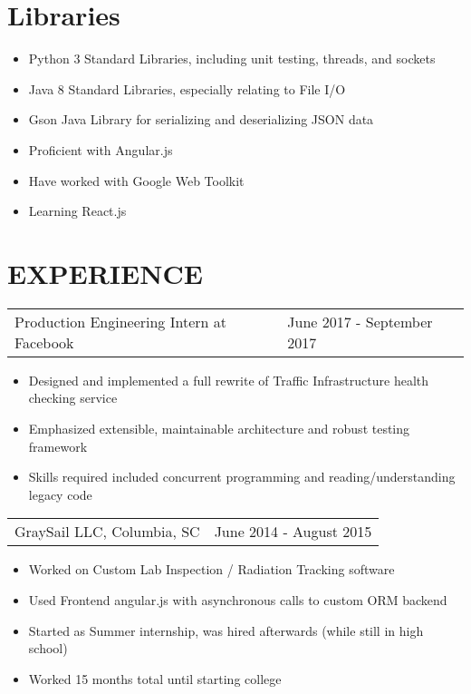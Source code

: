 \documentclass[margin]{res}
\begin{document}
\begin{resume}
\normalsize{\section{Libraries}}
    \begin{itemize} \itemsep -2pt
        \item Python 3 Standard Libraries, including unit testing, threads, and sockets
        \item Java 8 Standard Libraries, especially relating to File I/O
        \item Gson Java Library for serializing and deserializing JSON data
        \item Proficient with Angular.js
        \item Have worked with Google Web Toolkit
        \item Learning React.js
    \end{itemize}
 


\section{EXPERIENCE}      

    \begin{tabular}{p{3.5in} p{3in}} %
        Production Engineering Intern at Facebook & June 2017 - September 2017
    \end{tabular}
    \begin{itemize} \itemsep -2pt
        \item Designed and implemented a full rewrite of Traffic Infrastructure health checking service
        \item Emphasized extensible, maintainable architecture and robust testing framework
        \item Skills required included concurrent programming and reading/understanding legacy code
    \end{itemize}


    \begin{tabular}{p{3.5in} p{3in}}
        GraySail LLC, Columbia, SC        & June 2014 - August 2015
    \end{tabular}
    \begin{itemize} \itemsep -2pt
        \item Worked on Custom Lab Inspection / Radiation Tracking software
        \item Used Frontend angular.js with asynchronous calls to custom ORM backend
        \item Started as Summer internship, was hired afterwards (while still in high school)
        \item Worked 15 months total until starting college
	\end{itemize}


\end{resume}
\end{document}
